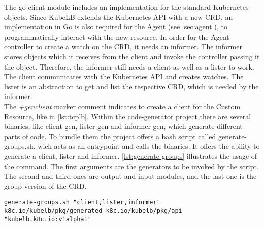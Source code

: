 The go-client module includes an implementation for the standard Kubernetes objects.
Since KubeLB extends the Kubernetes API with a new CRD, an implementation in Go is also required for the Agent (see \autoref{sec:agent}), to programmatically interact with the new resource.
In order for the Agent controller to create a watch on the CRD, it needs an informer.
The informer stores objects which it receives from the client and invoke the controller passing it the object.
Therefore, the informer still needs a client as well as a lister to work.
The client communicates with the Kubernetes API and creates watches.
The lister is an abstraction to get and list the respective CRD, which is needed by the informer.
\\
The \textit{+genclient} marker comment indicates to create a client for the Custom Resource, like in \autoref{lst:tcplb}.
Within the code-generator project there are several binaries, like client-gen, lister-gen and informer-gen, which generate different parts of code.
To bundle them the project offers a bash script called generate-groups.sh, wich acts as an entrypoint and calls the binaries.
It offers the ability to generate a client, lister and informer.
\autoref{lst:generate-groups} illustrates the usage of the command.
The first arguments are the generators to be invoked by the script.
The second and third ones are output and input modules, and the last one is the group version of the CRD.

\begin{lstlisting}[numbers=none, caption={Generate client, informer and lister with code-generator}, label={lst:generate-groups}]
	generate-groups.sh "client,lister,informer" k8c.io/kubelb/pkg/generated k8c.io/kubelb/pkg/api "kubelb.k8c.io:v1alpha1"
\end{lstlisting}

